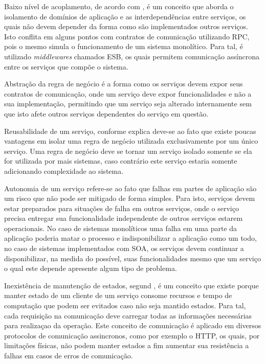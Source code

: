 Baixo nível de acoplamento, de acordo com , é um
conceito que aborda o isolamento de domínios de aplicação e as
interdependências entre serviços, os quais não devem depender da forma
como são implementados outros serviços. Isto conflita em alguns pontos
com contratos de comunicação utilizando \ac{RPC}, pois o mesmo simula
o funcionamento de um sistema monolítico. Para tal, é utilizado
\emph{middlewares} chamados \ac{ESB}, os quais permitem comunicação
assíncrona entre os serviços que compõe o sistema.

Abstração da regra de negócio é a forma como os serviços devem expor
seus contratos de comunicação, onde um serviço deve expor funcionalidades
e não a sua implementação, permitindo que um serviço seja alterado internamente
sem que isto afete outros serviços dependentes do serviço em questão.

Reusabilidade de um serviço, conforme explica  deve-se
ao fato que existe poucas vantagens em isolar uma regra de negócio utilizada
exclusivamente por um único serviço. Uma regra de negócio deve se tornar um
serviço isolado somente se ela for utilizada por mais sistemas, caso
contrário este serviço estaria somente adicionando complexidade ao sistema.

Autonomia de um serviço refere-se ao fato que falhas em partes de aplicação
são um risco que não pode ser mitigado de forma simples. Para isto, serviços
devem estar preparados para situações de falha em outros serviços, onde
o serviço precisa entregar sua funcionalidade independente de outros serviços
estarem operacionais. No caso de sistemas monolíticos uma falha
em uma parte da aplicação poderia matar o processo e indisponibilizar
a aplicação como um todo, no caso de sistemas implementados com \ac{SOA}, os
serviços devem continuar a disponibilizar, na medida do possível, suas
funcionalidades mesmo que um serviço o qual este depende apresente algum tipo
de problema.

Inexistência de manutenção de estados, segund , é
um conceito que existe porque manter estado de um cliente de um serviço
consome recursos e tempo de computação que podem ser evitados caso não seja
mantido estados. Para tal, cada requisição na comunicação deve carregar
todas as informações necessárias para realizaçao da operação. Este conceito
de comunicação é aplicado em diversos protocolos de comunicação assincronos,
como por exemplo o \ac{HTTP}, os quais, por limitações físicas, não podem
manter estados a fim aumentar sua resistência a falhas em casos de erros de
comunicação.

